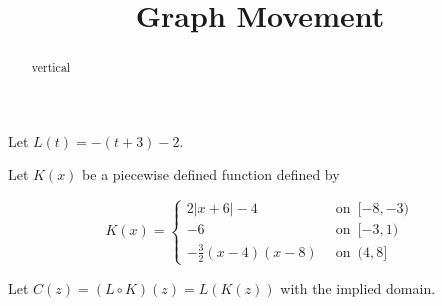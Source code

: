 \documentclass{ximera}
\title{Graph Movement}
\begin{document}
\begin{abstract}
vertical
\end{abstract}
\maketitle













Let $L(t) = -(t+3) - 2$.


Let $K(x)$ be a piecewise defined function defined by 


\[
K(x) = 
\begin{cases}
  2|x+6| - 4         &    \,     \text{ on } \,   [-8,-3)    \\
  -6               &    \,     \text{ on } \,    [-3,1)      \\
  -\frac{3}{2}(x-4)(x-8)    &   \,     \text{ on } \,    (4,8]
\end{cases}
\]



Let $C(z) = (L \circ K)(z) = L(K(z))$ with the implied domain.
\end{document}
